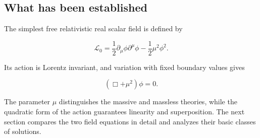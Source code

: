 \subsection{What has been established}

The simplest free relativistic real scalar field is defined by

\[
\mathcal{L}_{0}
=
\frac{1}{2}
\partial_{\mu}\phi\partial^{\mu}\phi
-
\frac{1}{2}\mu^{2}\phi^{2}.
\]

Its action is Lorentz invariant, and variation with fixed boundary values gives

\[
(\Box+\mu^{2})\phi=0.
\]

The parameter \(\mu\) distinguishes the massive and massless theories, while the quadratic form of the action guarantees linearity and superposition. The next section compares the two field equations in detail and analyzes their basic classes of solutions.